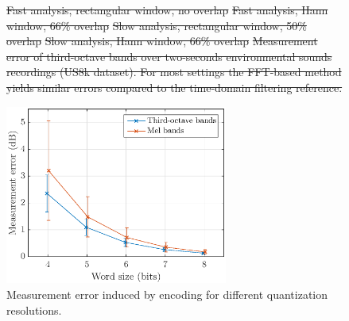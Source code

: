 \documentclass[sensors,article,accept,moreauthors,pdftex,10pt,a4paper]{mdpi}
\providecommand{\DIFdeltex}[1]{{\protect\color{red}\sout{#1}}}                      %
\providecommand{\DIFdelFL}[1]{\DIFdel{#1}} %
\providecommand{\DIFdelbeginFL}{} %
\providecommand{\DIFdelendFL}{} %
\providecommand{\DIFdel}[1]{\texorpdfstring{\DIFdeltex{#1}}{}} %
\begin{document}
\begin{figure}[H]
	\centering
		\DIFdelbeginFL %
{%
\DIFdelFL{Fast analysis, rectangular window, no overlap}}
{%
\DIFdelFL{Fast analysis, Hann window, 66\% overlap}}
{%
\DIFdelFL{Slow analysis, rectangular window, 50\% overlap}}
{%
\DIFdelFL{Slow analysis, Hann window, 66\% overlap}}
{%
\DIFdelFL{Measurement error of third-octave bands over two-seconds environmental sounds recordings (US8k dataset). For most settings the FFT-based method yields similar errors compared to the time-domain filtering reference. }%
}

\DIFdelendFL \includegraphics[width=0.65\textwidth]{figures/error_qall.eps}
	\caption{Measurement error induced by encoding for different quantization resolutions.}
	\label{fig:error_q}
\end{figure}
\end{document}
